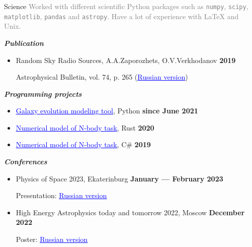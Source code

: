 \documentclass{resume} %
\newcommand{\link}[2]{\href{#1}{\textcolor{blue}{\underline{#2}}}}
\newcommand{\subheader}[1]{\textbf{\textit{#1}}}
\newcommand{\timestamp}[1]{\hfill {\small \textbf{#1}}}
\newcommand{\longversion}[1]{\ifdefined\LONG#1\fi}
\newcommand{\note}[1]{\textcolor{gray}{#1}}
\begin{document}
	\begin{rSection}{Science}
		\longversion{
			\note{
				Worked with different scientific Python packages such as \texttt{numpy}, \texttt{scipy}, \texttt{matplotlib}, \texttt{pandas} and \texttt{astropy}. 
				Have a lot of experience with LaTeX and Unix.
			}
		}

		\subheader{Publication}
		\begin{itemize}
			\item Random Sky Radio Sources, A.A.Zaporozhets, O.V.Verkhodanov \timestamp{2019}
		
			Astrophysical Bulletin, vol. 74, p. 265 (\link{http://www.sao.ru/Doc-k8/Science/Public/Bulletin/Vol74/N3/ASPB265.pdf}{Russian version})
		\end{itemize}

		\vspace{1em}

		\subheader{Programming projects}
		\begin{itemize}
			\item \link{https://github.com/Kraysent/OMTool}{Galaxy evolution modeling tool}, Python \timestamp{since June 2021}
			\item \link{https://github.com/Kraysent/XBodyModel}{Numerical model of N-body task}, Rust \timestamp{2020}
			\item \link{https://github.com/Kraysent/Gravity-Model}{Numerical model of N-body task}, C\# \timestamp{2019}
		\end{itemize}

		\longversion{
			\vspace{1em}

			\subheader{Conferences}
			\begin{itemize}
				\item Physics of Space 2023, Ekaterinburg \timestamp{January --- February 2023}
				
				Presentation: \link{https://www.overleaf.com/read/mnwwgvkqxdky}{Russian version}
				\item High Energy Astrophysics today and tomorrow 2022, Moscow \timestamp{December 2022}
				
				Poster: \link{https://www.overleaf.com/read/cwyptqpmdtdf}{Russian version}
			\end{itemize}
		}
	\end{rSection}
\end{document}
